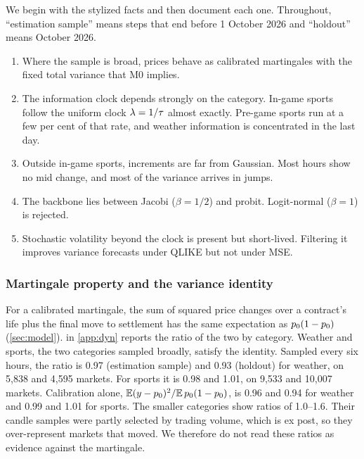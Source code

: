 
We begin with the stylized facts and then document each one. Throughout, ``estimation sample''
means steps that end before 1 October 2026 and ``holdout'' means October 2026.
\begin{enumerate}
\item Where the sample is broad, prices behave as calibrated martingales with the fixed total
  variance that M0 implies.
\item The information clock depends strongly on the category. In-game sports follow the uniform
  clock $\lambda=1/\tau$ almost exactly. Pre-game sports run at a few per cent of that rate, and
  weather information is concentrated in the last day.
\item Outside in-game sports, increments are far from Gaussian. Most hours show no mid change, and
  most of the variance arrives in jumps.
\item The backbone lies between Jacobi ($\beta=1/2$) and probit. Logit-normal ($\beta=1$) is
  rejected.
\item Stochastic volatility beyond the clock is present but short-lived. Filtering it improves
  variance forecasts under QLIKE but not under MSE.
\end{enumerate}

\subsubsection{Martingale property and the variance identity}\label{sec:dyn-res-mart}

For a calibrated martingale, the sum of squared price changes over a contract's life plus the final
move to settlement has the same expectation as $p_0(1-p_0)$ (\cref{sec:model}).
 in \cref{app:dyn} reports the ratio of the two by category.
Weather and sports, the two categories sampled broadly, satisfy the identity. Sampled
  every six hours, the ratio is 0.97 (estimation sample) and 0.93 (holdout) for weather, on 5{,}838
  and 4{,}595 markets. For sports it is 0.98 and 1.01, on 9{,}533 and 10{,}007 markets.
Calibration alone, $\mathbb{E}(y-p_0)^2/\mathbb{E}\,p_0(1-p_0)$, is 0.96 and 0.94 for weather and
  0.99 and 1.01 for sports.
The smaller categories show ratios of 1.0--1.6. Their candle samples were partly
  selected by trading volume, which is ex post, so they over-represent markets that moved. We
  therefore do not read these ratios as evidence against the martingale.

